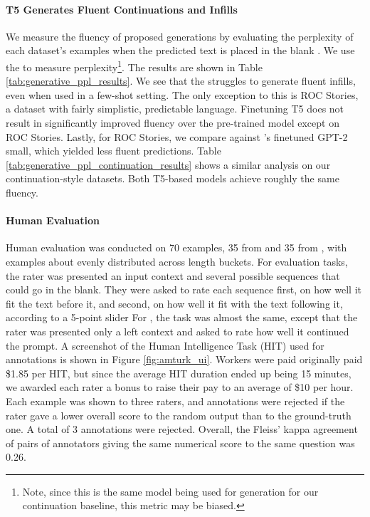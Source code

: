 \paragraph{T5 Generates Fluent Continuations and Infills}
We measure the fluency of proposed generations by evaluating the perplexity of each dataset's examples when the predicted text is placed in the blank \citep{donahue2020enabling}.
We use the \LLM{} to measure perplexity\footnote{Note, since this is the same model being used for generation for our continuation baseline, this metric may be biased.}.
The results are shown in Table \ref{tab:generative_ppl_results}.
We see that the \LLM{} struggles to generate fluent infills, even when used in a few-shot setting.
The only exception to this is ROC Stories, a dataset with fairly simplistic, predictable language.
Finetuning T5 does not result in significantly improved fluency over the pre-trained model except on ROC Stories. 
Lastly, for ROC Stories, we compare against \citet{donahue2020enabling}'s finetuned GPT-2 small, which yielded less fluent predictions.
Table \ref{tab:generative_ppl_continuation_results} shows a similar analysis on our continuation-style datasets. Both T5-based models achieve roughly the same fluency. 

\paragraph{Human Evaluation}
Human evaluation was conducted on 70 examples, 35 from \rwpFITB{} and 35 from \rwpFITE, with examples about evenly distributed across length buckets.
For \rwpFITB{} evaluation tasks, the rater was presented an input context and several possible sequences that could go in the blank. 
They were asked to rate each sequence first, on how well it fit the text before it, and second, on how well it fit with the text following it, according to a 5-point slider 
For \rwpFITB{}, the task was almost the same, except that the rater was presented only a left context and asked to rate how well it continued the prompt.
A screenshot of the Human Intelligence Task (HIT) used for annotations is shown in Figure \ref{fig:amturk_ui}. Workers were paid originally paid \$1.85 per HIT, but since the average HIT duration ended up being 15 minutes, we awarded each rater a bonus to raise their pay to an average of \$10 per hour.
Each example was shown to three raters, and annotations were rejected if the rater gave a lower overall score to the random output than to the ground-truth one.
A total of 3 annotations were rejected.
Overall, the Fleiss' kappa agreement of pairs of annotators giving the same numerical score to the same question was 0.26.

